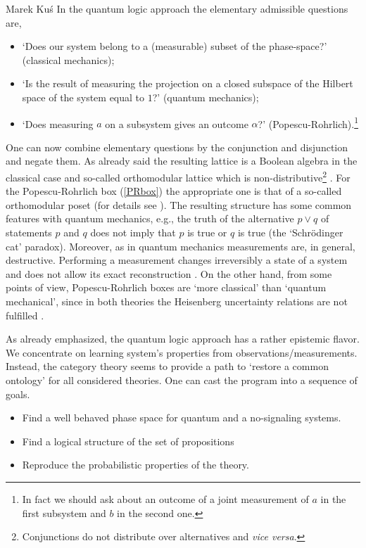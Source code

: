 \begin{artengenv}{Marek Ku\'s}
In the quantum logic approach the elementary admissible questions are,
\begin{itemize}
	\item `Does our system belong to a (measurable) subset of the phase-space?' (classical mechanics);
	\item `Is the result of measuring the projection on a closed subspace of the Hilbert space of the system equal to $1$?' (quantum mechanics);
	\item `Does measuring $a$ on a subsystem gives an outcome $\alpha$?' (Popescu-Rohrlich).\footnote{In fact we should ask about an outcome of a joint measurement of $a$ in the first subsystem and $b$ in the second one.}
\end{itemize}
One can now combine elementary questions by the conjunction and disjunction and negate them. As already said the resulting lattice is a Boolean algebra in the classical case and so-called orthomodular lattice which is non-distributive\footnote{Conjunctions do not distribute over alternatives and \textit{vice versa}.} \parencite{birkhoff_logic_1936}. For the Popescu-Rohrlich box (\ref{PRbox}) the appropriate one is that of a so-called orthomodular poset (for details see \parencite{tylec_non-signaling_2015,tylec_ignorance_2018}). The resulting structure has some common features with quantum mechanics, e.g., the truth of the alternative $p\vee q$ of statements $p$ and $q$ does not imply that $p$ is true or $q$ is true (the `Schr\"odinger cat' paradox). Moreover, as in quantum mechanics measurements are, in general, destructive. Performing a measurement changes irreversibly a state of a system and does not allow its exact reconstruction \parencite{tylec_non-signaling_2015}. On the other hand, from some points of view, Popescu-Rohrlich boxes are `more classical' than `quantum mechanical', since  in both theories the Heisenberg uncertainty relations are not fulfilled \parencite{tylec_non-signaling_2015}.   
 
As already emphasized, the quantum logic approach has a rather epistemic flavor. We concentrate on learning system's properties from observations/measurements. Instead, the category theory seems to provide a path to `restore a common ontology' for all considered theories. One can cast the program into a sequence of goals.

\begin{itemize}
	\item Find a well behaved phase space for quantum and a no-signaling systems. 
	\item Find a logical structure of the set of propositions 
	\item Reproduce the probabilistic properties of the theory.
\end{itemize} 


\end{artengenv}
